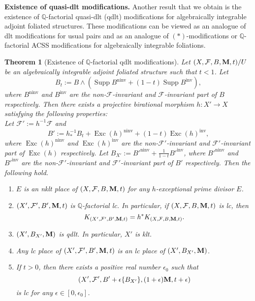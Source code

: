 \documentclass[12pt]{amsart}
\numberwithin{equation}{section}
\newcommand{\Mm}{{\bf{M}}}
\newcommand{\Qq}{\mathbb{Q}}
\newcommand{\Exc}{\operatorname{Exc}}
\newcommand{\ninv}{\operatorname{ninv}}
\newcommand{\inv}{\operatorname{inv}}
\newcommand{\Supp}{\operatorname{Supp}}
\newcommand{\Ff}{\mathcal{F}}
\newtheorem{thm}{Theorem}[section]
\theoremstyle{definition}
\theoremstyle{definition}
\theoremstyle{definition}
\begin{document}
\smallskip

\noindent\textbf{Existence of quasi-dlt modifications.} Another result that we obtain is the existence of $\Qq$-factorial quasi-dlt (qdlt) modifications for algebraically integrable adjoint foliated structures. These modifications can be viewed as an analogue of dlt modifications for usual pairs and as an analogue of $(\ast )$-modifications \cite{ACSS21,CS23a} or $\Qq$-factorial ACSS modifications \cite{CHLX23,LMX24b} for algebraically integrable foliations.


\begin{thm}[Existence of $\Qq$-factorial qdlt modifications]\label{thm: qdlt model intro}
    Let $(X,\Ff,B,\Mm,t)/U$ be an algebraically integrable adjoint foliated structure such that $t<1$. Let $$B_t:=B\wedge(\Supp B^{\ninv}+(1-t)\Supp B^{\inv}),$$
    where $B^{\ninv}$ and  $B^{\inv}$ are the non-$\Ff$-invariant and $\Ff$-invariant part of $B$ respectively. Then there exists a projective birational morphism $h: X'\rightarrow X$ satisfying the following properties:
    \\
    Let $\Ff':=h^{-1}\Ff$ and $$B':=h^{-1}_\ast B_t+\Exc(h)^{\ninv}+(1-t)\Exc(h)^{\inv},$$
    where $\Exc(h)^{\ninv}$ and  $\Exc(h)^{\inv}$ are the non-$\Ff'$-invariant and $\Ff'$-invariant part of $\Exc(h)$ respectively. Let $B_{X'}:=B'^{\ninv}+\frac{1}{1-t}B'^{\inv}$, where $B'^{\ninv}$ and  $B'^{\inv}$ are the non-$\Ff'$-invariant and $\Ff'$-invariant part of $B'$ respectively. Then the following hold.
    \begin{enumerate}
    \item $E$ is an nklt place of $(X,\Ff,B,\Mm,t)$ for any $h$-exceptional prime divisor $E$.
    \item $(X',\Ff',B',\Mm,t)$ is $\Qq$-factorial lc. In particular, if $(X,\Ff,B,\Mm,t)$ is lc, then
    $$K_{(X',\Ff',B',\Mm,t)}=h^\ast K_{(X,\Ff,B,\Mm,t)}.$$
    \item $(X',B_{X'},\Mm)$ is qdlt. In particular, $X'$ is klt.
    \item Any lc place of $(X',\Ff',B',\Mm,t)$ is an lc place of $(X',B_{X'},\Mm)$.
    \item If $t>0$, then there exists a positive real number $\epsilon_0$ such that 
    $$\left(X',\Ff',B'+\epsilon\{B_{X'}\},(1+\epsilon)\Mm,t+\epsilon\right)$$
    is lc for any $\epsilon\in [0,\epsilon_0]$.
    \end{enumerate}
\end{thm}

\medskip
\end{document}
